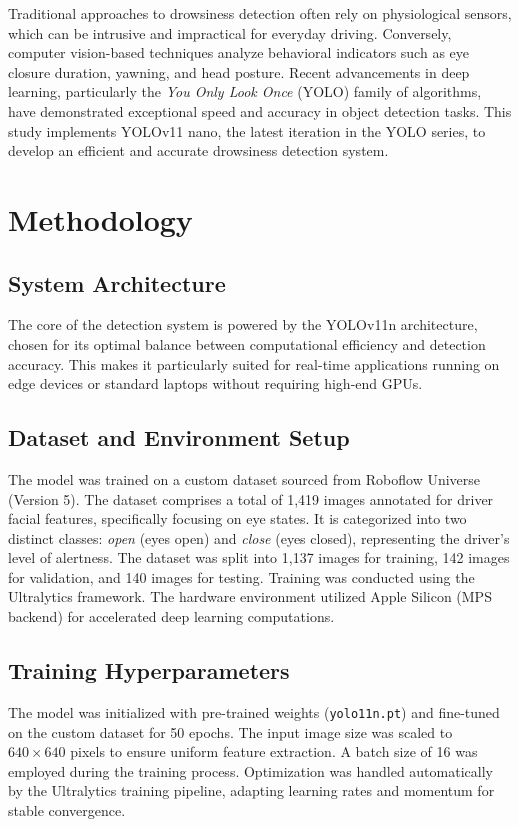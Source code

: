 \documentclass[conference]{IEEEtran}
\begin{document}
Traditional approaches to drowsiness detection often rely on physiological sensors, which can be intrusive and impractical for everyday driving. Conversely, computer vision-based techniques analyze behavioral indicators such as eye closure duration, yawning, and head posture. Recent advancements in deep learning, particularly the \textit{You Only Look Once} (YOLO) family of algorithms, have demonstrated exceptional speed and accuracy in object detection tasks. This study implements YOLOv11 nano, the latest iteration in the YOLO series, to develop an efficient and accurate drowsiness detection system.

\section{Methodology}

\subsection{System Architecture}
The core of the detection system is powered by the YOLOv11n architecture, chosen for its optimal balance between computational efficiency and detection accuracy. This makes it particularly suited for real-time applications running on edge devices or standard laptops without requiring high-end GPUs.

\subsection{Dataset and Environment Setup}
The model was trained on a custom dataset sourced from Roboflow Universe (Version 5). The dataset comprises a total of 1,419 images annotated for driver facial features, specifically focusing on eye states. It is categorized into two distinct classes: \textit{open} (eyes open) and \textit{close} (eyes closed), representing the driver's level of alertness. The dataset was split into 1,137 images for training, 142 images for validation, and 140 images for testing. Training was conducted using the Ultralytics framework. The hardware environment utilized Apple Silicon (MPS backend) for accelerated deep learning computations.

\subsection{Training Hyperparameters}
The model was initialized with pre-trained weights (\texttt{yolo11n.pt}) and fine-tuned on the custom dataset for 50 epochs. The input image size was scaled to $640 \times 640$ pixels to ensure uniform feature extraction. A batch size of 16 was employed during the training process. Optimization was handled automatically by the Ultralytics training pipeline, adapting learning rates and momentum for stable convergence.
\end{document}
